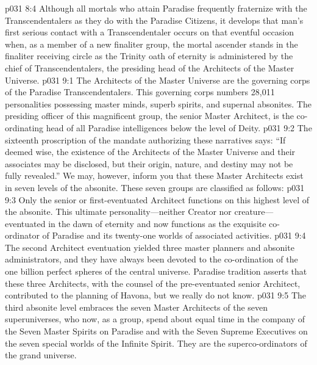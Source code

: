 \vs p031 8:4 Although all mortals who attain Paradise frequently fraternize with the Transcendentalers as they do with the Paradise Citizens, it develops that man’s first serious contact with a Transcendentaler occurs on that eventful occasion when, as a member of a new finaliter group, the mortal ascender stands in the finaliter receiving circle as the Trinity oath of eternity is administered by the chief of Transcendentalers, the presiding head of the Architects of the Master Universe.
%
\vs p031 9:1 The Architects of the Master Universe are the governing corps of the Paradise Transcendentalers. This governing corps numbers 28,011 personalities possessing master minds, superb spirits, and supernal absonites. The presiding officer of this magnificent group, the senior Master Architect, is the co\hyp{}ordinating head of all Paradise intelligences below the level of Deity.
\vs p031 9:2 The sixteenth proscription of the mandate authorizing these narratives says: “If deemed wise, the existence of the Architects of the Master Universe and their associates may be disclosed, but their origin, nature, and destiny may not be fully revealed.” We may, however, inform you that these Master Architects exist in seven levels of the absonite. These seven groups are classified as follows:\plusone
\pc \vs p031 9:3 \bibnobreakspace {} Only the senior or first\hyp{}eventuated Architect functions on this highest level of the absonite. This ultimate personality---neither Creator nor creature---eventuated in the dawn of eternity and now functions as the exquisite co\hyp{}ordinator of Paradise and its twenty\hyp{}one worlds of associated activities.
\pc \vs p031 9:4 \bibnobreakspace {} The second Architect eventuation yielded three master planners and absonite administrators, and they have always been devoted to the co\hyp{}ordination of the one billion perfect spheres of the central universe. Paradise tradition asserts that these three Architects, with the counsel of the pre\hyp{}eventuated senior Architect, contributed to the planning of Havona, but we really do not know.
\pc \vs p031 9:5 \bibnobreakspace {} The third absonite level embraces the seven Master Architects of the seven superuniverses, who now, as a group, spend about equal time in the company of the Seven Master Spirits on Paradise and with the Seven Supreme Executives on the seven special worlds of the Infinite Spirit. They are the superco\hyp{}ordinators of the grand universe.\plusone
